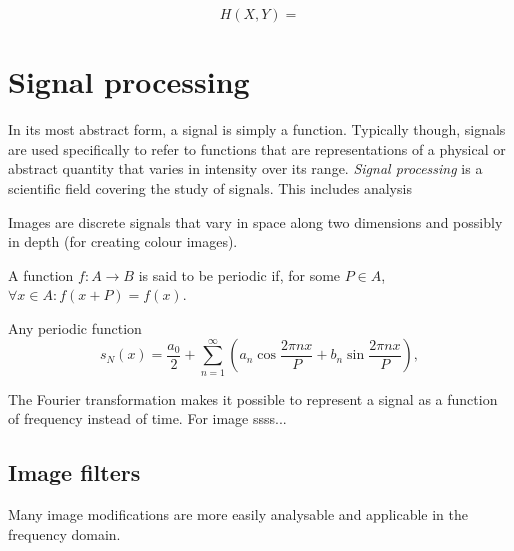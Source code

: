 

\begin{equation}
    H(X, Y) = 
\end{equation}


\section{Signal processing}
In its most abstract form, a signal is simply a function. Typically though, signals are used specifically to refer to functions that are representations of a physical or abstract quantity that varies in intensity over its range. \emph{Signal processing} is a scientific field covering the study of signals. This includes analysis 

Images are discrete signals that vary in space along two dimensions and possibly in depth (for creating colour images). 


\begin{definition}
A function $f: A \rightarrow B$ is said to be periodic if, for some $P\in A$, $\forall x\in A: f(x+P) = f(x)$.
\end{definition}

\begin{definition}
Any periodic function 
\begin{equation}
    s_N(x) = \frac{a_0}{2} + \sum_{n=1}^\infty\left(a_n \cos\frac{2\pi nx}{P} + b_n \sin\frac{2\pi nx}{P}\right),
\end{equation}

\end{definition}

The Fourier transformation makes it possible to represent a signal as a function of frequency instead of time. For image ssss...



\subsection{Image filters}
Many image modifications are more easily analysable and applicable in the frequency domain. 

